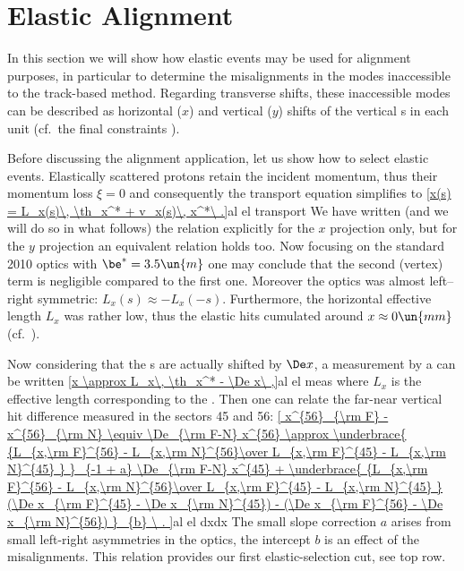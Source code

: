 \section[al elast]{Elastic Alignment}

In this section we will show how elastic events may be used for alignment purposes, in particular to determine the misalignments in the modes inaccessible to the track-based method. Regarding transverse shifts, these inaccessible modes can be described as horizontal ($x$) and vertical ($y$) shifts of the vertical s in each unit (cf.~the final constraints ).

Before discussing the alignment application, let us show how to select elastic events. Elastically scattered protons retain the incident momentum, thus their momentum loss $\xi = 0$ and consequently the transport equation  simplifies to
\eqref{x(s) = L_x(s)\, \th_x^* + v_x(s)\, x^*\ .}{al el transport}
We have written (and we will do so in what follows) the relation explicitly for the $x$ projection only, but for the $y$ projection an equivalent relation holds too. Now focusing on the standard 2010 optics with $\be^*=3.5\un{m}$ one may conclude that the second (vertex) term is negligible compared to the first one. Moreover the optics was almost left--right symmetric: $L_x(s) \approx - L_x(-s)$. Furthermore, the horizontal effective length $L_x$ was rather low, thus the elastic hits cumulated around $x\approx 0\un{mm}$ (cf.~).


Now considering that the s are actually shifted by $\De x$, a measurement by a  can be written
\eqref{x \approx L_x\, \th_x^* - \De x\ ,}{al el meas}
where $L_x$ is the effective length corresponding to the . Then one can relate the far-near vertical hit difference measured in the sectors 45 and 56:
\eqref{
	x^{56}_{\rm F} - x^{56}_{\rm N} \equiv \De_{\rm F-N} x^{56} \approx
	\underbrace{ {L_{x,\rm F}^{56} - L_{x,\rm N}^{56}\over L_{x,\rm F}^{45} - L_{x,\rm N}^{45} } }_{-1 + a} \De_{\rm F-N} x^{45} + 
	\underbrace{ {L_{x,\rm F}^{56} - L_{x,\rm N}^{56}\over L_{x,\rm F}^{45} - L_{x,\rm N}^{45} } (\De x_{\rm F}^{45} - \De x_{\rm N}^{45}) - (\De x_{\rm F}^{56} - \De x_{\rm N}^{56}) }_{b} \ .
}{al el dxdx}
The small slope correction $a$ arises from small left-right asymmetries in the optics, the intercept $b$ is an effect of the  misalignments. This relation provides our first elastic-selection cut, see  top row.

